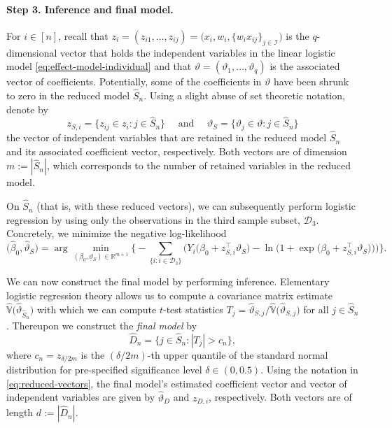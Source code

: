 \documentclass[11pt]{article}
\newcommand{\R}{\mathbb{R}}
\newcommand{\V}{\mathbb{V}}
\newcommand{\D}{\mathcal{D}}
\begin{document}
\paragraph{Step 3. Inference and final model.} For $i\in [n]$, recall that $z_i = (z_{i1},\dots, z_{ij}) = \big(x_i, w_i, \{ w_i x_{ij} \}_{j\in\mathcal{I}}\big)$ is the $q$-dimensional vector that holds the independent variables in the linear logistic model \eqref{eq:effect-model-individual} and that $\vartheta = (\vartheta_1, \dots, \vartheta_q)$ is the associated vector of coefficients. Potentially, some of the coefficients in $\vartheta$ have been shrunk to zero in the reduced model $\widehat{S}_n$. Using a slight abuse of set theoretic notation, denote by
\begin{equation}\label{eq:reduced-vectors}
    z_{S,i}
    =
    \Big\{
        z_{ij} \in z_i : j \in \widehat{S}_n
    \Big\}
    \quad \text{ and } \quad
    \vartheta_{S} 
    = 
    \Big\{
        \vartheta_j \in \vartheta : j \in \widehat{S}_n
    \Big\}
\end{equation}
the vector of independent variables that are retained in the reduced  model $\widehat{S}_n$ and its associated coefficient vector, respectively. Both vectors are of dimension $m := |\widehat{S}_n|$, which corresponds to the number of retained variables in the reduced model.

On $\widehat{S}_n$ (that is, with these reduced vectors), we can subsequently perform logistic regression by using only the observations in the third sample subset, $\D_3$. Concretely, we minimize the negative log-likelihood 
\begin{equation*} 
    \big(\widehat{\beta}_0, \widehat{\vartheta}_S\big)
    =
    \arg\min_{(\beta_0, \vartheta_S) \in \R^{m+1}}
    \Bigg\{
    - 
    \sum_{\{ i:i \in \D_3 \}} \bigg( Y_i \big(\beta_0 + z_{S,i}^\top \vartheta_S \big) - \ln\Big( 1 + \exp \big(\beta_0 + z_{S,i}^\top \vartheta_S\big) \Big)\bigg)\Bigg\}.
\end{equation*}

We can now construct the final model by performing inference. Elementary logistic regression theory allows us to compute a covariance matrix estimate $\widehat{\V}\big(\widehat{\vartheta}_{\widehat{S}_n}\big)$ with which we can compute $t$-test statistics $T_j = \widehat{\vartheta}_{S, j} \Big/ \widehat{\V}\big(\widehat{\vartheta}_{S,j}\big)$ for all $j \in \widehat{S}_n$. Thereupon we construct the \textit{final model} by
\[
    \widehat{D}_n = \Big\{ j\in\widehat{S}_n : |T_j| > c_n \Big\},
\]
where $c_n = z_{\delta/2m}$ is the $(\delta/2m)$-th upper quantile of the standard normal distribution for pre-specified significance level $\delta\in(0,0.5)$. Using the notation in \eqref{eq:reduced-vectors}, the final model's  estimated coefficient vector and vector of independent variables are given by  $\widehat{\vartheta}_D$ and $z_{D,i}$, respectively. Both vectors are of length $d := |\widehat{D}_n|$.
\end{document}
